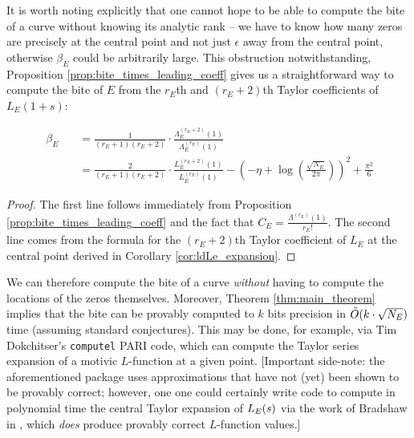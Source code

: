 It is worth noting explicitly that one cannot hope to be able to compute the bite of a curve without knowing its analytic rank -- we have to know how many zeros are precisely at the central point and not just $\epsilon$ away from the central point, otherwise $\beta_E$ could be arbitrarily large. This obstruction notwithstanding, Proposition \ref{prop:bite_times_leading_coeff} gives us a straightforward way to compute the bite of $E$ from the $r_E$th and $(r_E+2)$th Taylor coefficients of $L_E(1+s)$:
\begin{corollary}
\begin{align}\
\beta_E \quad &= \frac{1}{(r_E+1)(r_E+2)} \cdot \frac{\Lambda_E^{(r_E+2)}(1)}{\Lambda_E^{(r_E)}(1)} \label{eqn:bite_via_Lams} \\
&= \frac{2}{(r_E+1)(r_E+2)} \cdot \frac{L_E^{(r_E+2)}(1)}{L_E^{(r_E)}(1)} - \left(-\eta+\log\left(\frac{\sqrt{N_E}}{2\pi}\right)\right)^2 + \frac{\pi^2}{6} \label{eqn:bite_via_L_E}
\end{align}
\end{corollary}
\begin{proof}
The first line follows immediately from Proposition \ref{prop:bite_times_leading_coeff} and the fact that $C_E = \frac{\Lambda^{(r_E)}(1)}{r_E!}$. The second line comes from the formula for the $(r_E+2)$th Taylor coefficient of $L_E$ at the central point derived in Corollary \ref{cor:ldLe_expansion}.
\end{proof}
We can therefore compute the bite of a curve {\it without} having to compute the locations of the zeros themselves. Moreover, Theorem \ref{thm:main_theorem} implies that the bite can be provably computed to $k$ bits precision in $\tilde{O}(k\cdot \sqrt{N_E})$ time (assuming standard conjectures). This may be done, for example, via Tim Dokchitser's {\tt computel} PARI code, which can compute the Taylor series expansion of a motivic $L$-function at a given point. [Important side-note: the aforementioned package uses approximations that have not (yet) been shown to be provably correct; however, one one could certainly write code to compute in polynomial time the central Taylor expansion of $L_E(s)$ via the work of Bradshaw in \cite{Bra-2010}, which {\it does} produce provably correct $L$-function values.] \\

